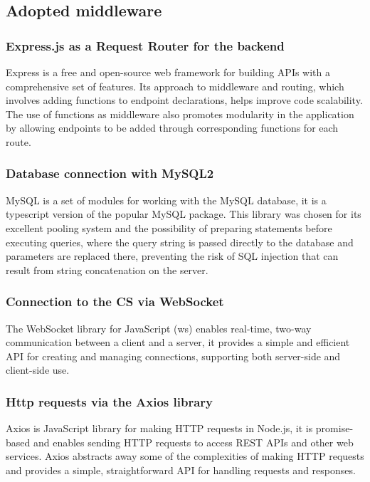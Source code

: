\documentclass[11pt]{article}
\begin{document}
\subsection{Adopted middleware}

\subsubsection{Express.js as a Request Router for the backend}

Express is a free and open-source web framework for building APIs with a comprehensive set of features. Its approach to middleware and routing, which involves adding functions to endpoint declarations, helps improve code scalability. The use of functions as middleware also promotes modularity in the application by allowing endpoints to be added through corresponding functions for each route.

\subsubsection{Database connection with MySQL2}

MySQL is a set of modules for working with the MySQL database, it is a typescript version of the popular MySQL package. This library was chosen for its excellent pooling system and the possibility of preparing statements before executing queries, where the query string is passed directly to the database and parameters are replaced there, preventing the risk of SQL injection that can result from string concatenation on the server.

\subsubsection{Connection to the CS via WebSocket}

The WebSocket library for JavaScript (ws) enables real-time, two-way communication between a client and a server, it provides a simple and efficient API for creating and managing connections, supporting both server-side and client-side use.

\subsubsection{Http requests via the Axios library}

Axios is JavaScript library for making HTTP requests in Node.js, it is promise-based and enables sending HTTP requests to access REST APIs and other web services. Axios abstracts away some of the complexities of making HTTP requests and provides a simple, straightforward API for handling requests and responses.
\end{document}
